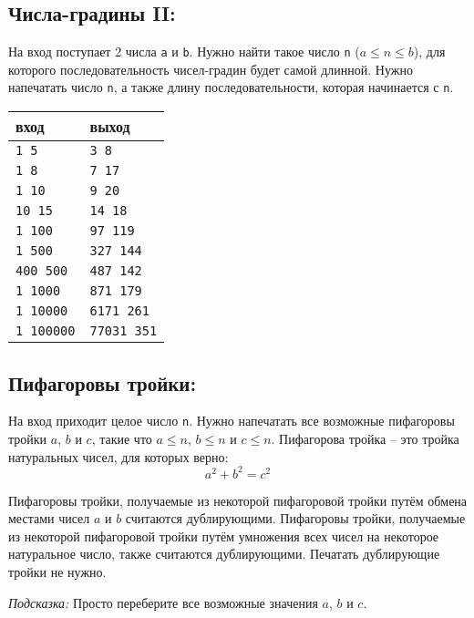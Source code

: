 \documentclass[10pt]{article}
\begin{document}
\subsection{Числа-градины II:}
На вход поступает 2 числа \texttt{a} и \texttt{b}. Нужно найти такое число \texttt{n} ($a \le n \le b$), для которого последовательность чисел-градин будет самой длинной. Нужно напечатать число \texttt{n}, а также длину последовательности, которая начинается с \texttt{n}.
\begin{center}
\begin{tabular}{ l l }
 вход & выход \\ \hline
 \texttt{1 5}  & \texttt{3 8}  \\ 
 \texttt{1 8} & \texttt{7 17}  \\ 
 \texttt{1 10} & \texttt{9 20}  \\ 
 \texttt{10 15} & \texttt{14 18}  \\ 
 \texttt{1 100} & \texttt{97 119}  \\ 
 \texttt{1 500} & \texttt{327 144}  \\ 
 \texttt{400 500} & \texttt{487 142}  \\ 
 \texttt{1 1000} & \texttt{871 179}  \\ 
 \texttt{1 10000} & \texttt{6171 261}  \\ 
 \texttt{1 100000} & \texttt{77031 351}  \\ 
\end{tabular}
\end{center}



\subsection{Пифагоровы тройки:}
На вход приходит целое число \texttt{n}. Нужно напечатать все возможные пифагоровы тройки $a$, $b$ и $c$, такие что $a \le n$, $b \le n$ и $c \le n$. Пифагорова тройка -- это тройка натуральных чисел, для которых верно:
$$
a^2 + b^2 = c^2
$$

Пифагоровы тройки, получаемые из некоторой пифагоровой тройки путём обмена местами чисел $a$ и $b$ считаются дублирующими. Пифагоровы тройки, получаемые из некоторой пифагоровой тройки путём умножения всех чисел на некоторое натуральное число, также считаются дублирующими. Печатать дублирующие тройки не нужно.

\textit{Подсказка:} Просто переберите все возможные значения $a$, $b$ и $c$.
\end{document}
